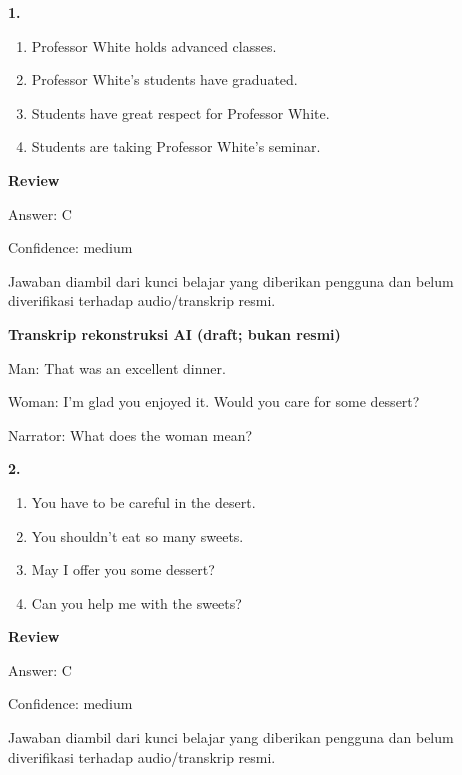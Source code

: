 \documentclass[12pt]{article}
\begin{document}
\noindent\textbf{1.}
\begin{enumerate}[label=(\Alph*),leftmargin=*,itemsep=0.2em]
\item Professor White holds advanced classes.
\item Professor White's students have graduated.
\item Students have great respect for Professor White.
\item Students are taking Professor White's seminar.
\end{enumerate}
\par
\begingroup
\setlength{\parskip}{0pt}
\setlength{\parindent}{0pt}
\textbf{Review}\par
Answer: C\par
Confidence: medium\par
Jawaban diambil dari kunci belajar yang diberikan pengguna dan belum diverifikasi terhadap audio/transkrip resmi.\par
\endgroup
\par
\vspace{0.25\baselineskip}
\begin{exampleblock}
\textbf{Transkrip rekonstruksi AI (draft; bukan resmi)}\par
Man: That was an excellent dinner.\par
Woman: I'm glad you enjoyed it. Would you care for some dessert?\par
Narrator: What does the woman mean?\par
\end{exampleblock}
\noindent\textbf{2.}
\begin{enumerate}[label=(\Alph*),leftmargin=*,itemsep=0.2em]
\item You have to be careful in the desert.
\item You shouldn't eat so many sweets.
\item May I offer you some dessert?
\item Can you help me with the sweets?
\end{enumerate}
\par
\begingroup
\setlength{\parskip}{0pt}
\setlength{\parindent}{0pt}
\textbf{Review}\par
Answer: C\par
Confidence: medium\par
Jawaban diambil dari kunci belajar yang diberikan pengguna dan belum diverifikasi terhadap audio/transkrip resmi.\par
\endgroup
\par
\vspace{0.25\baselineskip}
\end{document}
